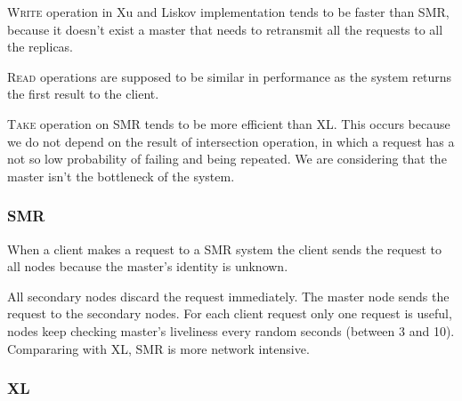 \documentclass[times, 10pt,twocolumn]{article}
\begin{document}


\textsc{Write} operation in Xu and Liskov implementation tends to be faster than SMR, because it doesn't exist a master
that needs to retransmit all the requests to all the replicas.

\textsc{Read} operations are supposed to be similar in performance as the system returns the first result to the client.

\textsc{Take} operation on SMR tends to be more efficient than XL. This occurs because we do not depend on the result 
of intersection operation, in which a request has a not so low probability of failing and being repeated. 
We are considering that the master isn't the bottleneck of the system.  


\subsubsection{SMR}


When a client makes a request to a SMR system the client sends the request to all nodes because the master's identity is unknown.

All secondary nodes discard the request immediately. The master node
sends the request to the secondary nodes. For each client request only one request is useful, nodes keep checking master's liveliness every random seconds (between 3 and 10). 
Compararing with XL, SMR is more network intensive.

\subsubsection{XL}
\end{document}
